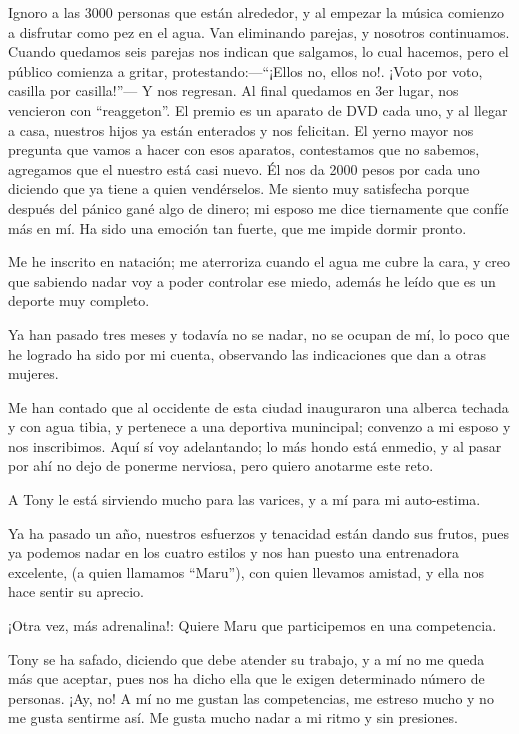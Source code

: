 \documentclass[letterpaper, 12pt]{book}
\begin{document}
Ignoro a las 3000 personas que están alrededor, y al empezar la música comienzo a disfrutar como pez en el agua. Van eliminando parejas, y nosotros continuamos. Cuando quedamos seis parejas nos indican que salgamos, lo cual hacemos, pero el público comienza a gritar, protestando:---``¡Ellos no, ellos no!. ¡Voto por voto, casilla por casilla!''--- Y nos regresan. Al final quedamos en 3er lugar, nos vencieron con ``reaggeton''. El premio es un aparato de DVD cada uno, y al llegar a casa, nuestros hijos ya están enterados y nos felicitan. El yerno mayor nos pregunta que vamos a hacer con esos aparatos, contestamos que no sabemos, agregamos que el nuestro está casi nuevo. Él nos da 2000 pesos por cada uno diciendo que ya tiene a quien vendérselos. Me siento muy satisfecha porque después del pánico gané algo de dinero; mi esposo me dice tiernamente que confíe más en mí. Ha sido una emoción tan fuerte, que me impide dormir pronto.

Me he inscrito en natación; me aterroriza cuando el agua me cubre la cara, y creo que sabiendo nadar voy a poder controlar ese miedo, además he leído que es un deporte muy completo.

Ya han pasado tres meses y todavía no se nadar, no se ocupan de mí, lo poco que he logrado ha sido por mi cuenta, observando las indicaciones que dan a otras mujeres.

Me han contado que al occidente de esta ciudad inauguraron una alberca techada y con agua tibia, y pertenece a una deportiva munincipal; convenzo a mi esposo y nos inscribimos. Aquí sí voy adelantando; lo más hondo está enmedio, y al pasar por ahí no dejo de ponerme nerviosa, pero quiero anotarme este reto.

A Tony le está sirviendo mucho para las varices, y a mí para mi auto-estima.

Ya ha pasado un año, nuestros esfuerzos y tenacidad están dando sus frutos, pues ya podemos nadar en los cuatro estilos y nos han puesto una entrenadora excelente, (a quien llamamos ``Maru''), con quien llevamos amistad, y ella nos hace sentir su aprecio.

¡Otra vez, más adrenalina!: Quiere Maru que participemos en una competencia.

Tony se ha safado, diciendo que debe atender su trabajo, y a mí no me queda más que aceptar, pues nos ha dicho ella que le exigen determinado número de personas. ¡Ay, no! A mí no me gustan las competencias, me estreso mucho y no me gusta sentirme así. Me gusta mucho nadar a mi ritmo y sin presiones.
\end{document}

